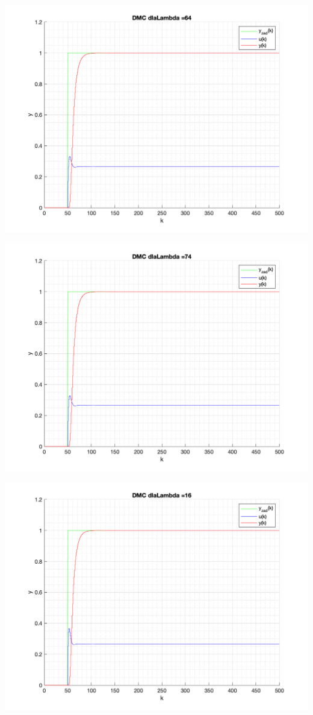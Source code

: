 \documentclass[a4paper, 11pt]{article}
\begin{document}
\begin{enumerate}
 \includegraphics[width=\linewidth]{./ModelsP4_Lambda/P4_DMC_Lambda_64_png.png} 
 
 \includegraphics[width=\linewidth]{./ModelsP4_Lambda/P4_DMC_Lambda_74_png.png} 
 
 \includegraphics[width=\linewidth]{./ModelsP4_Lambda/P4_DMC_Lambda_16_png.png} 
 

\end{enumerate}
\end{document}
